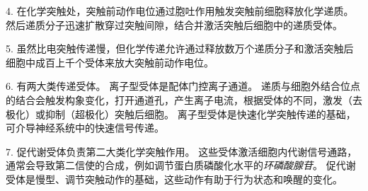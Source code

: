 4. 在化学突触处，突触前动作电位通过胞吐作用触发突触前细胞释放化学递质。
然后递质分子迅速扩散穿过突触间隙，结合并激活突触后细胞中的递质受体。


5. 虽然比电突触传递慢，但化学传递允许通过释放数万个递质分子和激活突触后细胞中成百上千个受体来放大突触前动作电位。


6. 有两大类传递受体。
离子型受体是配体门控离子通道。
递质与细胞外结合位点的结合会触发构象变化，打开通道孔，产生离子电流，根据受体的不同，激发（去极化）或抑制（超极化）突触后细胞。
离子型受体是快速化学突触传递的基础，可介导神经系统中的快速信号传递。


7. 促代谢受体负责第二大类化学突触作用。
这些受体激活细胞内代谢信号通路，通常会导致第二信使的合成，例如调节蛋白质磷酸化水平的\textit{环磷酸腺苷}。
促代谢受体是慢型、调节突触动作的基础，这些动作有助于行为状态和唤醒的变化。


